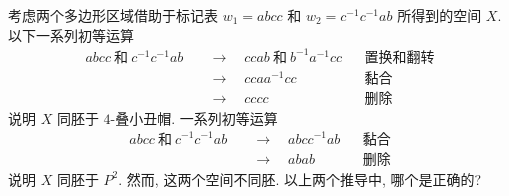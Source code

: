 \begin{exercise}
\label{exercise:ch12-sec76-02}
考虑两个多边形区域借助于标记表 $w_{1}=abcc$ 和 $w_{2}=c^{-1}c^{-1}ab$ 所得到的空间 $X$. 以下一系列初等运算
\begin{align*}
abcc\ \text{和}\ c^{-1}c^{-1}ab\quad&\longrightarrow\quad ccab\ \text{和}\ b^{-1}a^{-1}cc &&\text{置换和翻转}\\
&\longrightarrow\quad ccaa^{-1}cc &&\text{黏合}\\
&\longrightarrow\quad cccc &&\text{删除}
\end{align*}
说明 $X$ 同胚于 $4$-叠小丑帽. 一系列初等运算
\begin{align*}
abcc\ \text{和}\ c^{-1}c^{-1}ab\quad&\longrightarrow\quad abcc^{-1}ab &&\text{黏合}\\
&\longrightarrow\quad abab &&\text{删除}
\end{align*}
说明 $X$ 同胚于 $P^{2}$. 然而, 这两个空间不同胚. 以上两个推导中, 哪个是正确的?
\end{exercise}
